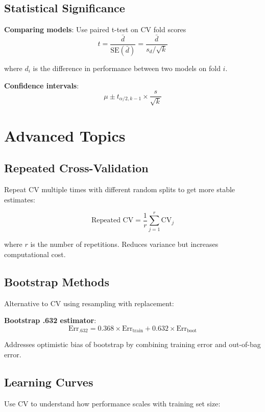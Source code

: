 \documentclass{article}
\begin{document}
\subsection{Statistical Significance}

\textbf{Comparing models}: Use paired t-test on CV fold scores
$$t = \frac{\bar{d}}{\text{SE}(\bar{d})} = \frac{\bar{d}}{s_d / \sqrt{k}}$$

where $d_i$ is the difference in performance between two models on fold $i$.

\textbf{Confidence intervals}:
$$\mu \pm t_{\alpha/2, k-1} \times \frac{s}{\sqrt{k}}$$

\section{Advanced Topics}

\subsection{Repeated Cross-Validation}

Repeat CV multiple times with different random splits to get more stable estimates:

$$\text{Repeated CV} = \frac{1}{r} \sum_{j=1}^r \text{CV}_j$$

where $r$ is the number of repetitions. Reduces variance but increases computational cost.

\subsection{Bootstrap Methods}

Alternative to CV using resampling with replacement:

\textbf{Bootstrap .632 estimator}:
$$\text{Err}_{.632} = 0.368 \times \text{Err}_{\text{train}} + 0.632 \times \text{Err}_{\text{boot}}$$

Addresses optimistic bias of bootstrap by combining training error and out-of-bag error.

\subsection{Learning Curves}

Use CV to understand how performance scales with training set size:

\begin{center}
\end{center}
\end{document}
